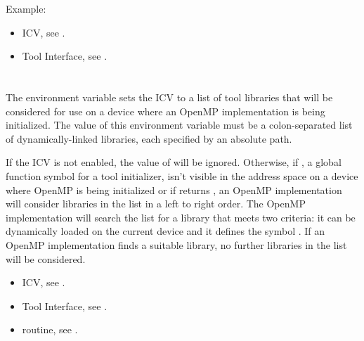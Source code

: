 Example:
\begin{ompEnv}
\end{ompEnv}

\crossreferences
\begin{itemize}
\item {} ICV, see .
\item Tool Interface, see .
\end{itemize}




\section{}
\label{sec:OMP_TOOL_LIBRARIES}

The  environment variable sets the
 ICV to a list of tool libraries that will
be considered for use on a device where an OpenMP implementation
is being initialized.  The value of this environment variable must
be a colon-separated list of dynamically-linked libraries, each
specified by an absolute path.

If the  ICV is not enabled,
the value of  will be ignored.
Otherwise, if , a global function symbol for a tool initializer,
isn't visible in the address space on a device where OpenMP is being
initialized or if  returns , an OpenMP implementation
will consider libraries in the  list
in a left to right order.  The OpenMP implementation will search the list for
a library that meets two criteria: it can be dynamically
loaded on the current device and it defines the symbol .
If an OpenMP implementation finds a suitable library,
no further libraries in the list will be considered.

\crossreferences
\begin{itemize}
\item {} ICV, see .
\item Tool Interface, see .
\item {} routine, see .
\end{itemize}

